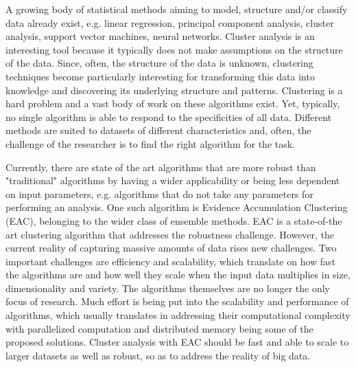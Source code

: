 A growing body of statistical methods aiming to model, structure and/or classify data already exist, e.g. linear regression, principal component analysis, cluster analysis, support vector machines, neural networks.
Cluster analysis is an interesting tool because it typically does not make assumptions on the structure of the data.
Since, often, the structure of the data is unknown, clustering techniques become particularly interesting for transforming this data into knowledge and discovering its underlying structure and patterns.
Clustering is a hard problem and a vast body of work on these algorithms exist.
Yet, typically, no single algorithm is able to respond to the specificities of all data.
Different methods are suited to datasets of different characteristics and, often, the challenge of the researcher is to find the right algorithm for the task. %

Currently, there are state of the art algorithms that are more robust than "traditional" algorithms by having a wider applicability or being less dependent on input parameters, e.g. algorithms that do not take any parameters for performing an analysis.
One such algorithm is Evidence Accumulation Clustering (EAC), belonging to the wider class of ensemble methods.
EAC is a state-of-the art clustering algorithm that addresses the robustness challenge.
However, the current reality of capturing massive amounts of data rises new challenges.
Two important challenges are efficiency and scalability, which translate on how fast the algorithms are and how well they scale when the input data multiplies in size, dimensionality and variety.
The algorithms themselves are no longer the only focus of research.
Much effort is being put into the scalability and performance of algorithms, which usually translates in addressing their computational complexity with parallelized computation and distributed memory being some of the proposed solutions.
Cluster analysis with EAC should be fast and able to scale to larger datasets as well as robust, so as to address the reality of big data.


